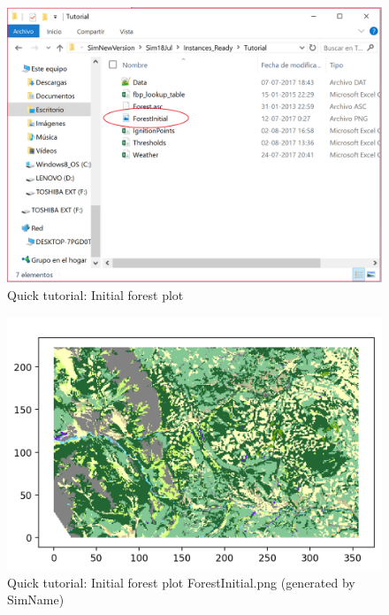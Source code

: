 \documentclass[11pt]{article}
\begin{document}
\begin{enumerate}
\begin{itemize}
\begin{figure}[h!]
\centering
\includegraphics[scale=0.6]{Tutorial2.png}
\caption{\label{fig:Tut2} Quick tutorial: Initial forest plot}
\end{figure}

\begin{figure}[h!]
\centering
\includegraphics[scale=0.8]{Tutorial3.png}
\caption{\label{fig:Tut3} Quick tutorial: Initial forest plot ForestInitial.png (generated by SimName)}
\end{figure}				


\end{itemize}
\end{enumerate}
\end{document}

